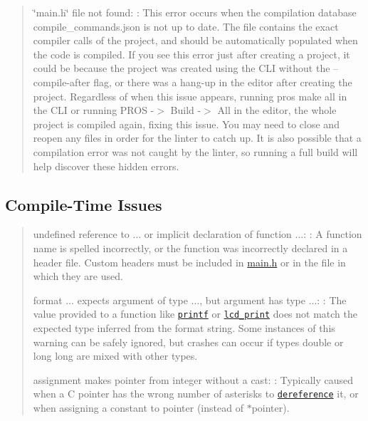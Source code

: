 \begin{quote}

\begin{DoxyItemize}
\item {\ttfamily \char`\"{}main.\+h\char`\"{} file not found}\+: \+: This error occurs when the compilation database {\ttfamily compile\+\_\+commands.\+json} is not up to date. The file contains the exact compiler calls of the project, and should be automatically populated when the code is compiled. If you see this error just after creating a project, it could be because the project was created using the C\+LI without the {\ttfamily –compile-\/after} flag, or there was a hang-\/up in the editor after creating the project. Regardless of when this issue appears, running {\ttfamily pros make all} in the C\+LI or running {\ttfamily P\+R\+OS -\/$>$ Build -\/$>$ All} in the editor, the whole project is compiled again, fixing this issue. You may need to close and reopen any files in order for the linter to catch up. It is also possible that a compilation error was not caught by the linter, so running a full build will help discover these hidden errors. 
\end{DoxyItemize}\end{quote}


\subsection*{Compile-\/\+Time Issues}

\begin{quote}

\begin{DoxyItemize}
\item {\ttfamily undefined reference to ...} or {\ttfamily implicit declaration of function ...}\+: \+: A function name is spelled incorrectly, or the function was incorrectly declared in a header file. Custom headers must be included in {\ttfamily \hyperlink{main_8h}{main.\+h}} or in the file in which they are used.
\item {\ttfamily format ... expects argument of type ..., but argument has type ...}\+: \+: The value provided to a function like \href{http://www.cplusplus.com/reference/cstdio/printf/}{\tt printf} or \href{../../api/c/llemu.html#lcd-print}{\tt lcd\+\_\+print} does not match the expected type inferred from the format string. Some instances of this warning can be safely ignored, but crashes can occur if types {\ttfamily double} or {\ttfamily long long} are mixed with other types.
\item {\ttfamily assignment makes pointer from integer without a cast}\+: \+: Typically caused when a C pointer has the wrong number of asterisks to \href{http://stackoverflow.com/a/4955297/3681958}{\tt dereference} it, or when assigning a constant to {\ttfamily pointer} (instead of {\ttfamily $\ast$pointer}). 
\end{DoxyItemize}\end{quote}


